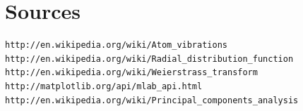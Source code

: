 \documentclass[12pt,letterpaper]{article}
\begin{document}
\section{Sources}
\begin{verbatim}
http://en.wikipedia.org/wiki/Atom_vibrations
http://en.wikipedia.org/wiki/Radial_distribution_function
http://en.wikipedia.org/wiki/Weierstrass_transform
http://matplotlib.org/api/mlab_api.html
http://en.wikipedia.org/wiki/Principal_components_analysis
\end{verbatim}

\end{document}

